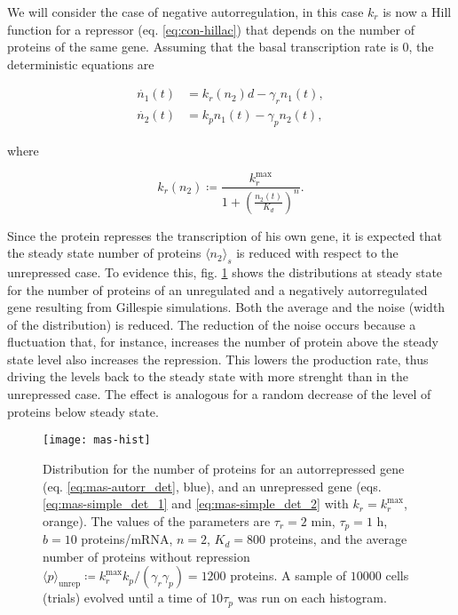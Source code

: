 We will consider the case of negative autorregulation, in this case $k_r$ is now a Hill function for a repressor (eq. \eqref{eq:con-hillac}) that depends on the number of proteins of the same gene. Assuming that the basal transcription rate is $0$, the deterministic equations are

\begin{equation}
  \label{eq:mas-autorr_det}
  \begin{split}
    \dot{n_1}(t) &= k_r(n_2)d - \gamma_rn_1(t),\\
    \dot{n_2}(t) &= k_pn_1(t)-\gamma_pn_2(t),
  \end{split}
\end{equation}

where

\begin{equation*}
  k_r(n_2) \coloneqq \frac{k_r^{\text{max}}}{1+\left(\frac{n_2(t)}{K_d}\right)^n}.
\end{equation*}

Since the protein represses the transcription of his own gene, it is expected that the steady state number of proteins $\langle n_2\rangle_s$ is reduced with respect to the unrepressed case. To evidence this, fig. \ref{fig:mas-sim_hist} shows the distributions at steady state for the number of proteins of an unregulated and a negatively autorregulated gene resulting from Gillespie simulations. Both the average and the noise (width of the distribution) is reduced. The reduction of the noise occurs because a fluctuation that, for instance, increases the number of protein above the steady state level also increases the repression. This lowers the production rate, thus driving the levels back to the steady state with more strenght than in the unrepressed case. The effect is analogous for a random decrease of the level of proteins below steady state.


\begin{figure}[H]
  \centering
  \texttt{[image: mas-hist]}
  \caption[Histograms for protein number for a constitutive gene and a negatively autorregulated gene]{\label{fig:mas-sim_hist}Distribution for the number of proteins for an autorrepressed gene (eq. \ref{eq:mas-autorr_det}, blue), and an unrepressed gene (eqs. \ref{eq:mas-simple_det_1} and \ref{eq:mas-simple_det_2} with $k_r = k_r^\text{max}$, orange). The  values of the parameters are $\tau_r=2$ min, $\tau_p=1$ h, $b=10$ proteins/mRNA, $n=2$, $K_d=800$ proteins, and the average number of proteins without repression $\langle p\rangle_\text{unrep} \coloneqq k_r^\text{max}k_p/(\gamma_r\gamma_p) = 1200$ proteins. A sample of $10000$ cells (trials) evolved until a time of $10\tau_p$ was run on each histogram.}
\end{figure}

